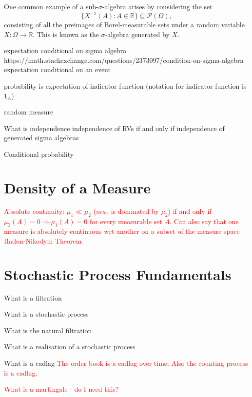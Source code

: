 \documentclass[honours,12pt]{unswthesis}
\def\implies{\Rightarrow}
\numberwithin{equation}{section}
\begin{document}
One common example of a sub-$\sigma$-algebra arises by considering the set
$$\{X^{-1}(A) : A\in\mathbb{R}\}\subseteq\mathcal{P}(\Omega),$$
consisting of all the preimages of Borel-measurable sets under a random variable $X:\Omega\to\mathbb{R}$. This is known as the $\sigma$-algebra generated by $X$.

expectation conditional on sigma algebra
https://math.stackexchange.com/questions/2373097/condition-on-sigma-algebra
expectation conditional on an event


probability is expectation of indicator function (notation for indicator function is $1_A$)

random measure

What is independence
independence of RVs if and only if independence of generated sigma algebras

Conditional probability

\section{Density of a Measure}
\textcolor{red}{Absolute continuity: $\mu_1\ll\mu_2$ ($mu_1$ is dominated by $\mu_2$) if and only if $\mu_2(A)=0\implies\mu_1(A)=0$ for every measurable set $A$. Can also say that one measure is absolutely continuous wrt another on a subset of the measure space}
\textcolor{red}{Radon-Nikodym Theorem}

\section{Stochastic Process Fundamentals}
What is a filtration

What is a stochastic process

What is the natural filtration

What is a realisation of a stochastic process

What is a cadlag \textcolor{red}{The order book is a cadlag over time. Also the counting process is a cadlag.}

\textcolor{red}{What is a martingale - do I need this?}





\clearpage
{}

\end{document}
